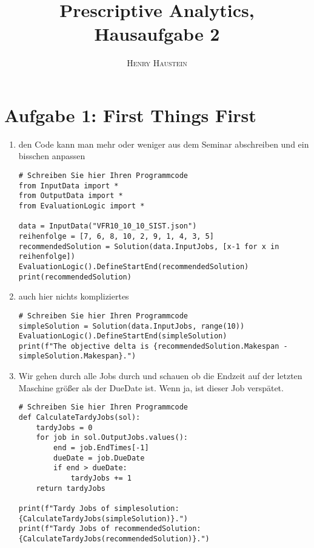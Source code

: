 \documentclass{article}
\title{\textbf{Prescriptive Analytics, Hausaufgabe 2}}
\author{\textsc{Henry Haustein}}
\date{}
\begin{document}
	\maketitle
	
	\section*{Aufgabe 1: First Things First}
	\begin{enumerate}[label=(\alph*)]
		\item den Code kann man mehr oder weniger aus dem Seminar abschreiben und ein bisschen anpassen
		\begin{lstlisting}
# Schreiben Sie hier Ihren Programmcode
from InputData import *
from OutputData import *
from EvaluationLogic import *

data = InputData("VFR10_10_10_SIST.json")
reihenfolge = [7, 6, 8, 10, 2, 9, 1, 4, 3, 5]
recommendedSolution = Solution(data.InputJobs, [x-1 for x in reihenfolge])
EvaluationLogic().DefineStartEnd(recommendedSolution)
print(recommendedSolution)
		\end{lstlisting}
		\item auch hier nichts kompliziertes
		\begin{lstlisting}
# Schreiben Sie hier Ihren Programmcode
simpleSolution = Solution(data.InputJobs, range(10))
EvaluationLogic().DefineStartEnd(simpleSolution)
print(f"The objective delta is {recommendedSolution.Makespan - simpleSolution.Makespan}.")
		\end{lstlisting}
		\item Wir gehen durch alle Jobs durch und schauen ob die Endzeit auf der letzten Maschine größer als der DueDate ist. Wenn ja, ist dieser Job verspätet.
		\begin{lstlisting}
# Schreiben Sie hier Ihren Programmcode
def CalculateTardyJobs(sol):
	tardyJobs = 0
	for job in sol.OutputJobs.values():
		end = job.EndTimes[-1]
		dueDate = job.DueDate
		if end > dueDate:
			tardyJobs += 1
	return tardyJobs

print(f"Tardy Jobs of simplesolution: {CalculateTardyJobs(simpleSolution)}.")
print(f"Tardy Jobs of recommendedSolution: {CalculateTardyJobs(recommendedSolution)}.")
		\end{lstlisting}
	\end{enumerate}
\end{document}
